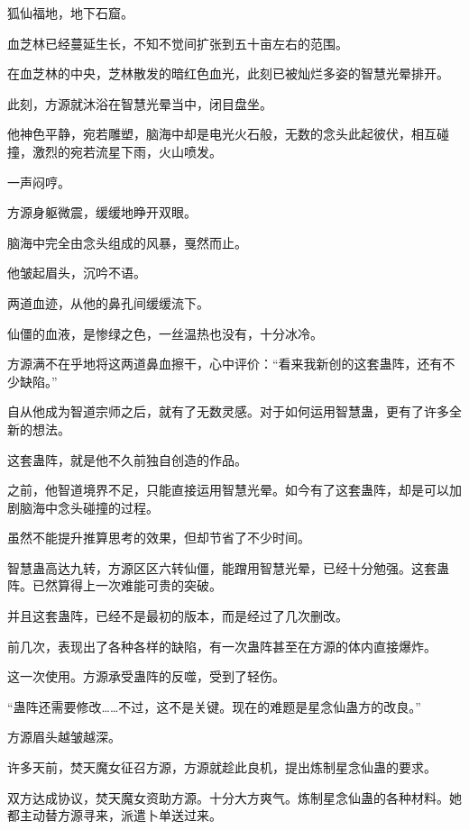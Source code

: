 
\begin{this_body}

狐仙福地，地下石窟。

血芝林已经蔓延生长，不知不觉间扩张到五十亩左右的范围。

在血芝林的中央，芝林散发的暗红色血光，此刻已被灿烂多姿的智慧光晕排开。

此刻，方源就沐浴在智慧光晕当中，闭目盘坐。

他神色平静，宛若雕塑，脑海中却是电光火石般，无数的念头此起彼伏，相互碰撞，激烈的宛若流星下雨，火山喷发。

一声闷哼。

方源身躯微震，缓缓地睁开双眼。

脑海中完全由念头组成的风暴，戛然而止。

他皱起眉头，沉吟不语。

两道血迹，从他的鼻孔间缓缓流下。

仙僵的血液，是惨绿之色，一丝温热也没有，十分冰冷。

方源满不在乎地将这两道鼻血擦干，心中评价：“看来我新创的这套蛊阵，还有不少缺陷。”

自从他成为智道宗师之后，就有了无数灵感。对于如何运用智慧蛊，更有了许多全新的想法。

这套蛊阵，就是他不久前独自创造的作品。

之前，他智道境界不足，只能直接运用智慧光晕。如今有了这套蛊阵，却是可以加剧脑海中念头碰撞的过程。

虽然不能提升推算思考的效果，但却节省了不少时间。

智慧蛊高达九转，方源区区六转仙僵，能蹭用智慧光晕，已经十分勉强。这套蛊阵。已然算得上一次难能可贵的突破。

并且这套蛊阵，已经不是最初的版本，而是经过了几次删改。

前几次，表现出了各种各样的缺陷，有一次蛊阵甚至在方源的体内直接爆炸。

这一次使用。方源承受蛊阵的反噬，受到了轻伤。

“蛊阵还需要修改……不过，这不是关键。现在的难题是星念仙蛊方的改良。”

方源眉头越皱越深。

许多天前，焚天魔女征召方源，方源就趁此良机，提出炼制星念仙蛊的要求。

双方达成协议，焚天魔女资助方源。十分大方爽气。炼制星念仙蛊的各种材料。她都主动替方源寻来，派遣卜单送过来。


\end{this_body}
